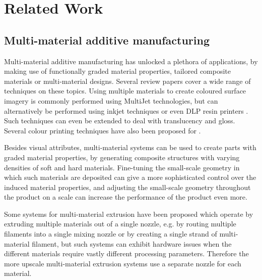 \section{Related Work}\label{interlocking:sec:related_work}

\subsection{Multi-material additive manufacturing}
Multi-material additive manufacturing has unlocked a plethora of applications, by making use of functionally graded material properties, tailored composite materials or multi-material designs.
Several review papers cover a wide range of techniques on these topics.\cite{Vaezi2013,Rafiee2020}
Using multiple materials to create coloured surface imagery is commonly performed using MultiJet technologies, but can alternatively be performed using inkjet techniques\cite{sachs1994three} or even DLP resin printers \cite{Zhou2011Development}.
Such techniques can even be extended to deal with translucency\cite{Brunton2018} and gloss\cite{elkhuizen2019gloss}.
Several colour printing techniques have also been proposed for .\cite{reiner2014dual,Song2019,Kuipers2018}

Besides visual attributes, multi-material systems can be used to create parts with graded material properties, by generating composite structures with varying densities of soft and hard materials.\cite{Cho2003851}
Fine-tuning the small-scale geometry in which such materials are deposited can give a more sophisticated control over the induced material properties,\cite{Leung2019,mirzaali2020}
and adjusting the small-scale geometry throughout the product on a  scale can increase the performance of the product even more.\cite{Zhu2017}

Some  systems for multi-material extrusion have been proposed which operate by extruding multiple materials out of a single nozzle, e.g. by routing multiple filaments into a single mixing nozzle\cite{diamondhotend} or by creating a single strand of multi-material filament\cite{Takahashi2020,Mosaic2015},
but such systems can exhibit hardware issues when the different materials require vastly different processing parameters.
Therefore the more upscale multi-material extrusion systems use a separate nozzle for each material.\cite{UltimakerS5}



